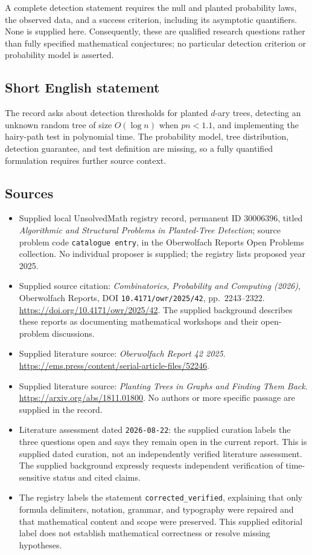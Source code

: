 \documentclass[11pt]{article}
\begin{document}
A complete detection statement requires the null and planted probability laws, the observed data, and a success criterion, including its asymptotic quantifiers. None is supplied here. Consequently, these are qualified research questions rather than fully specified mathematical conjectures; no particular detection criterion or probability model is asserted.
\subsection{Short English statement}
The record asks about detection thresholds for planted \(d\)-ary trees, detecting an unknown random tree of size \(O(\log n)\) when \(pn<1.1\), and implementing the hairy-path test in polynomial time. The probability model, tree distribution, detection guarantee, and test definition are missing, so a fully quantified formulation requires further source context.
\subsection{Sources}
\begin{itemize}
\item Supplied local UnsolvedMath registry record, permanent ID \(30006396\), titled \emph{Algorithmic and Structural Problems in Planted-Tree Detection}; source problem code \texttt{catalogue entry}, in the Oberwolfach Reports Open Problems collection. No individual proposer is supplied; the registry lists proposed year 2025.
\item Supplied source citation: \emph{Combinatorics, Probability and Computing (2026)}, Oberwolfach Reports, DOI \texttt{10.4171/owr/2025/42}, pp.~2243--2322. \url{https://doi.org/10.4171/owr/2025/42}. The supplied background describes these reports as documenting mathematical workshops and their open-problem discussions.
\item Supplied literature source: \emph{Oberwolfach Report 42 2025}. \url{https://ems.press/content/serial-article-files/52246}.
\item Supplied literature source: \emph{Planting Trees in Graphs and Finding Them Back}. \url{https://arxiv.org/abs/1811.01800}. No authors or more specific passage are supplied in the record.
\item Literature assessment dated \texttt{2026-08-22}: the supplied curation labels the three questions open and says they remain open in the current report. This is supplied dated curation, not an independently verified literature assessment. The supplied background expressly requests independent verification of time-sensitive status and cited claims.
\item The registry labels the statement \texttt{corrected\_verified}, explaining that only formula delimiters, notation, grammar, and typography were repaired and that mathematical content and scope were preserved. This supplied editorial label does not establish mathematical correctness or resolve missing hypotheses.
\end{itemize}
\end{document}
